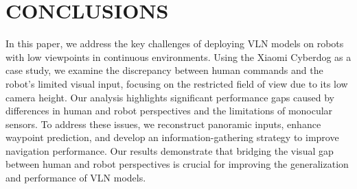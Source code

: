 \section{CONCLUSIONS}
In this paper, we address the key challenges of deploying VLN models on robots with low viewpoints in continuous environments. Using the Xiaomi Cyberdog as a case study, we examine the discrepancy between human commands and the robot’s limited visual input, focusing on the restricted field of view due to its low camera height. Our analysis highlights significant performance gaps caused by differences in human and robot perspectives and the limitations of monocular sensors. To address these issues, we reconstruct panoramic inputs, enhance waypoint prediction, and develop an information-gathering strategy to improve navigation performance. Our results demonstrate that bridging the visual gap between human and robot perspectives is crucial for improving the generalization and performance of VLN models.

